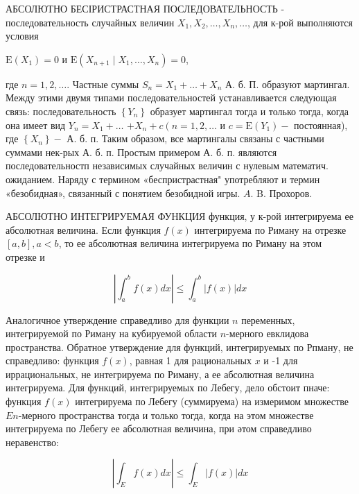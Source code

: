 \documentclass[10pt]{article}
\begin{document}
АБСОЛЮТНО БЕСІРИСТРАСТНАЯ ПОСЛЕДОВАТЕЛЬНОСТЬ - последовательность случайных величин $X_{1}, X_{2}, \ldots, X_{n}, \ldots$, для к-рой выполняются условия



$\mathrm{E}\left(X_{1}\right)=0$ и $\mathrm{E}\left(X_{n+1} \mid X_{1}, \ldots, X_{n}\right)=0$,



где $n=1,2, \ldots$. Частные суммы $S_{n}=X_{1}+\ldots+X_{n}$ А. б. П. образуют мартингал. Между этими двумя типами последовательностей устанавливается следующая связь: последовательность $\left\{Y_{n}\right\}$ образует мартингал тогда и только тогда, когда она имеет вид $Y_{n}=X_{1}+\ldots$ $+X_{n}+c\left(n=1,2, \ldots\right.$ и $c=\mathrm{E}\left(Y_{1}\right)-$ постоянная), где $\left\{X_{n}\right\}-$ А. б. п. Таким образом, все мартингалы связаны с частными суммами нек-рых А. б. п. Простым примером А. б. п. являются последовательностп независимых случайных величин с нулевым математич. ожиданием. Наряду с термином «беспристрастная" употребляют и термин «безобидная», связанный с понятием безобидной игры. $A$. B. Прохоров.



АБСОЛЮТНО ИНТЕГРИРУЕМАЯ ФУНКЦИЯ функция, у к-рой интегрируема ее абсолютная величина. Если функция $f(x)$ интегрируема по Риману на отрезке $[a, b], a<b$, то ее абсолютная величина интегрируема по Риману на этом отрезке и



\[

\left|\int_{a}^{b} f(x) d x\right| \leqslant \int_{a}^{b}|f(x)| d x

\]



Аналогичное утверждение справедливо для функции $n$ переменных, интегрируемой по Риману на кубируемой области $n$-мерного евклидова пространства. Обратное утверждение для функций, интегрируемых по Рпману, не справедливо: функция $f(x)$, равная 1 для рациональных $x$ и -1 для иррациональных, не интегрируема по Риману, а ее абсолютная величина интегрируема. Для функций, интегрируемых по Лебегу, дело обстоит пначе: функция $f(x)$ интегрируема по Лебегу (суммируема) на измеримом множестве $E n$-мерного пространства тогда и только тогда, когда на этом множестве интегрируема по Лебегу ее абсолютная величина, при әтом справедливо неравенство:



\[

\left|\int_{E} f(x) d x\right| \leqslant \int_{E}|f(x)| d x

\]
\end{document}
